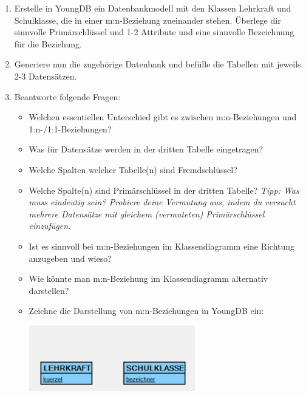 
\begin{enumerate}
    \item Erstelle in YoungDB ein Datenbankmodell mit den Klassen Lehrkraft und Schulklasse, die in einer m:n-Beziehung zueinander stehen. Überlege dir sinnvolle Primärschlüssel und 1-2 Attribute und eine sinnvolle Bezeichnung für die Beziehung.
    \item Generiere nun die zugehörige Datenbank und befülle die Tabellen mit jeweils 2-3 Datensätzen.
    \item Beantworte folgende Fragen:\begin{itemize}
        \item Welchen essentiellen Unterschied gibt es zwischen m:n-Beziehungen und 1:n-/1:1-Beziehungen?
        
        \item Was für Datensätze werden in der dritten Tabelle eingetragen?
        
        \item Welche Spalten welcher Tabelle(n) sind Fremdschlüssel?
        
        \item Welche Spalte(n) sind Primärschlüssel in der dritten Tabelle? \emph{Tipp: Was muss eindeutig sein? Probiere deine Vermutung aus, indem du versucht mehrere Datensätze mit gleichem (vermuteten) Primärschlüssel einzufügen.} 
        
        \item Ist es sinnvoll bei m:n-Beziehungen im Klassendiagramm eine Richtung anzugeben und wieso?
        
        \item Wie könnte man m:n-Beziehung im Klassendiagramm alternativ darstellen?
        
        \item Zeichne die Darstellung von m:n-Beziehungen in YoungDB ein:
        
        \includegraphics[width=0.6\textwidth]{img/YDB_lehrerKlasse.png}
    \end{itemize}
\end{enumerate} 